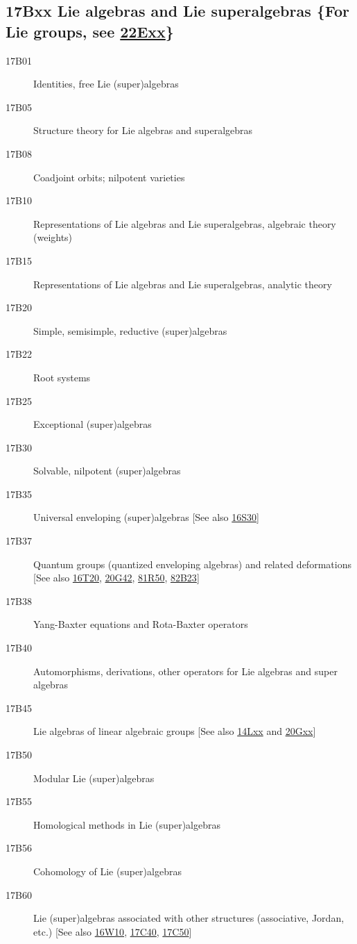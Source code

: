 \documentclass[letterpaper]{article}
\begin{document}
\subsection*{17Bxx  Lie algebras and Lie superalgebras \{For Lie groups, see \hyperref[22Exx]{22Exx}\} }\label{17Bxx}
\begin{description}  
\item [17B01]\label{17B01} Identities, free Lie (super)algebras
\item [17B05]\label{17B05} Structure theory for Lie algebras and superalgebras 
\item [17B08]\label{17B08} Coadjoint orbits; nilpotent varieties
\item [17B10]\label{17B10} Representations of Lie algebras and Lie superalgebras, algebraic theory (weights)
\item [17B15]\label{17B15} Representations of Lie algebras and Lie superalgebras, analytic theory
\item [17B20]\label{17B20} Simple, semisimple, reductive (super)algebras
\item [17B22]\label{17B22} Root systems
\item [17B25]\label{17B25} Exceptional (super)algebras
\item [17B30]\label{17B30} Solvable, nilpotent (super)algebras
\item [17B35]\label{17B35} Universal enveloping (super)algebras [See also \hyperref[16S30]{16S30}]
\item [17B37]\label{17B37} Quantum groups (quantized enveloping algebras) and related deformations [See also \hyperref[16T20]{16T20}, \hyperref[20G42]{20G42}, \hyperref[81R50]{81R50}, \hyperref[82B23]{82B23}]
\item [17B38]\label{17B38} Yang-Baxter equations and Rota-Baxter operators
\item [17B40]\label{17B40} Automorphisms, derivations, other operators for Lie algebras and super algebras
\item [17B45]\label{17B45} Lie algebras of linear algebraic groups [See also \hyperref[14Lxx]{14Lxx} and \hyperref[20Gxx]{20Gxx}]
\item [17B50]\label{17B50} Modular Lie (super)algebras
\item [17B55]\label{17B55} Homological methods in Lie (super)algebras
\item [17B56]\label{17B56} Cohomology of Lie (super)algebras
\item [17B60]\label{17B60} Lie (super)algebras associated with other structures (associative, Jordan, etc.) [See also \hyperref[16W10]{16W10}, \hyperref[17C40]{17C40}, \hyperref[17C50]{17C50}]

\end{description}
\end{document}
